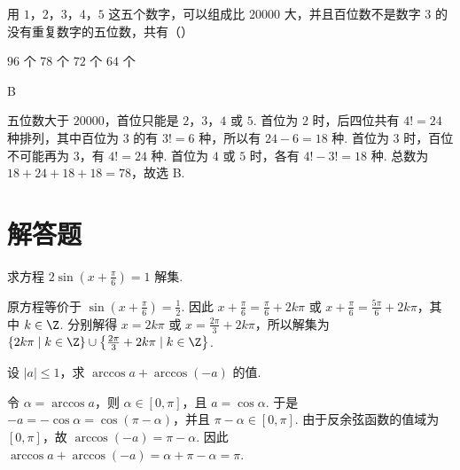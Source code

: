 \begin{problem}

用 \(1\)，\(2\)，\(3\)，\(4\)，\(5\) 这五个数字，可以组成比 \(20000\) 大，并且百位数不是数字 \(3\) 的没有重复数字的五位数，共有（\quad）

\choices
    {\(96\text{ 个}\)}
    {\(78\text{ 个}\)}
    {\(72\text{ 个}\)}
    {\(64\text{ 个}\)}

\begin{answer}
B
\end{answer}

\begin{solution}
五位数大于 \(20000\)，首位只能是 \(2\)，\(3\)，\(4\) 或 \(5\). 首位为 \(2\) 时，后四位共有 \(4!=24\) 种排列，其中百位为 \(3\) 的有 \(3!=6\) 种，所以有 \(24-6=18\) 种. 首位为 \(3\) 时，百位不可能再为 \(3\)，有 \(4!=24\) 种. 首位为 \(4\) 或 \(5\) 时，各有 \(4!-3!=18\) 种. 总数为 \(18+24+18+18=78\)，故选 B.
\end{solution}
\end{problem}

\section{解答题}

\begin{problem}

求方程 \(2\sin \left(x + \frac{\pi}{6}\right) = 1\) 解集.

\begin{solution}
原方程等价于 \(\sin\left(x+\frac{\pi}{6}\right)=\frac{1}{2}\). 因此 \(x+\frac{\pi}{6}=\frac{\pi}{6}+2k\pi\) 或 \(x+\frac{\pi}{6}=\frac{5\pi}{6}+2k\pi\)，其中 \(k\in\Z\). 分别解得 \(x=2k\pi\) 或 \(x=\frac{2\pi}{3}+2k\pi\)，所以解集为 \(\left\{2k\pi\mid k\in\Z\right\}\cup\left\{\frac{2\pi}{3}+2k\pi\mid k\in\Z\right\}\).
\end{solution}
\end{problem}

\begin{problem}

设 \(|a|\leqslant 1\)，求 \(\arccos a+\arccos\left(-a\right)\) 的值.

\begin{solution}
令 \(\alpha=\arccos a\)，则 \(\alpha\in[0,\pi]\)，且 \(a=\cos\alpha\). 于是 \(-a=-\cos\alpha=\cos\left(\pi-\alpha\right)\)，并且 \(\pi-\alpha\in[0,\pi]\). 由于反余弦函数的值域为 \([0,\pi]\)，故 \(\arccos(-a)=\pi-\alpha\). 因此 \(\arccos a+\arccos(-a)=\alpha+\pi-\alpha=\pi\).
\end{solution}
\end{problem}

